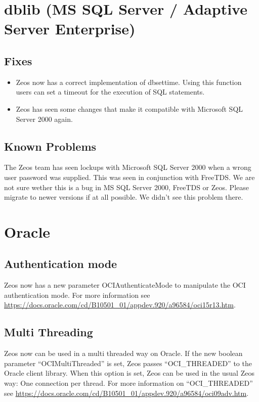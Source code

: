 \documentclass[a4paper,12pt,oneside]{book}
\begin{document}
\section{dblib (MS SQL Server / Adaptive Server Enterprise)}

\subsection{Fixes}

\begin{itemize}
\item Zeos now has a correct implementation of dbsettime. Using this function users can set a timeout for the execution of SQL statements.
\item Zeos has seen some changes that make it compatible with Microsoft SQL Server 2000 again.
\end{itemize}

\subsection{Known Problems}

The Zeos team has seen lockups with Microsoft SQL Server 2000 when a wrong user password was supplied.
This was seen in conjunction with FreeTDS.
We are not sure wether this is a bug in MS SQL Server 2000, FreeTDS or Zeos.
Please migrate to newer versions if at all possible.
We didn't see this problem there.

\section{Oracle}

\subsection{Authentication mode}

Zeos now has a new parameter OCIAuthenticateMode to manipulate the OCI authentication mode.
For more information see \url{https://docs.oracle.com/cd/B10501_01/appdev.920/a96584/oci15r13.htm}.

\subsection{Multi Threading}

Zeos now can be used in a multi threaded way on Oracle.
If the new boolean parameter "`OCIMultiThreaded"' is set, Zeos passes "`OCI\_THREADED"' to the Oracle client library.
When this option is set, Zeos can be used in the usual Zeos way: One connection per thread.
For more information on "`OCI\_THREADED"' see \url{https://docs.oracle.com/cd/B10501_01/appdev.920/a96584/oci09adv.htm}.
\end{document}
